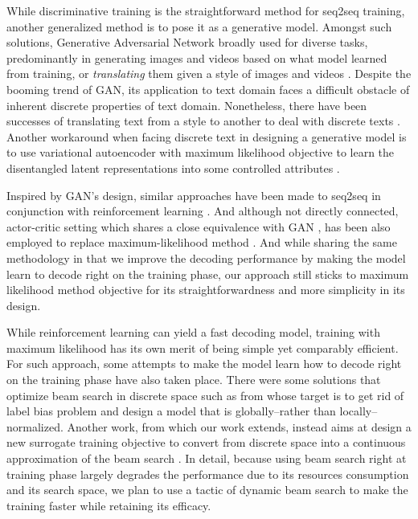 \documentclass[11pt,a4paper]{article}
\begin{document}
While discriminative training is the straightforward method for seq2seq training, another generalized method is to pose it as a generative model. Amongst such solutions, Generative Adversarial Network \cite{goodfellow2014generative} broadly used for diverse tasks, predominantly in generating images \cite{dcgan2015,berthelot2017began,zhang2017stackgan,progressive_gan_2017,li2017mmd} and videos \cite{vondrick2016generating} based on what model learned from training, or \textit{translating} them given a style of images \cite{conditional_gan_2014,pix2pix2017,discoGAN2017,mechrez2017photorealistic,luan2017deep,zhu2017unpaired,ma2018gan} and videos \cite{ruder2016artistic,liu2017unsupervised}. Despite the booming trend of GAN, its application to text domain faces a difficult obstacle of inherent discrete properties of text domain. Nonetheless, there have been successes of translating text from a style to another 
to deal with discrete texts \cite{boundaryseeking_gan_2017,yu2017seqgan,shen2017style}.  
Another workaround when facing discrete text in designing a generative model is to use variational autoencoder \cite{kingma2013auto} with maximum likelihood objective to learn the disentangled latent representations into some controlled attributes \cite{controlled_text_gen_2017}. 

Inspired by GAN's design, similar approaches have been made to seq2seq in conjunction with reinforcement learning \cite{kusner2016gans, yu2017seqgan,gu2017neural, gumbel2017}. And although not directly connected, actor-critic setting which shares a close equivalence with GAN \cite{pfau2016connecting}, has been also employed to replace maximum-likelihood method \cite{bahdanau2017actor}. And while sharing the same methodology in that we improve the decoding performance by making the model learn to decode right on the training phase, our approach still sticks to maximum likelihood method objective for its straightforwardness and more simplicity in its design.  

While reinforcement learning can yield a fast decoding model, training with maximum likelihood has its own merit of being simple yet comparably efficient. For such approach, some attempts to make the model learn how to decode right on the training phase have also taken place. There were some solutions that optimize beam search in discrete space such as from \citet{wiseman2016sequence, andor2016globally} whose target is to get rid of label bias problem and design a model that is globally--rather than locally--normalized. Another work, from which our work extends, instead aims at design a new surrogate training objective to convert from discrete space into a continuous approximation of the beam search \cite{goyal2018continuous}. In detail, because using beam search right at training phase largely degrades the performance due to its resources consumption and its search space, we plan to use a tactic of dynamic beam search \cite{buckman2016transition} to make the training faster while retaining its efficacy. 
\end{document}
